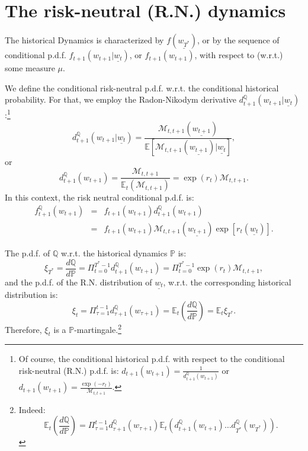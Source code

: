 \documentclass[
  12pt,
]{book}
\theoremstyle{definition}
\theoremstyle{definition}
\theoremstyle{definition}
\theoremstyle{definition}
\theoremstyle{remark}
\begin{document}
\hypertarget{PricingRN}{%
\section{The risk-neutral (R.N.) dynamics}\label{PricingRN}}

The historical Dynamics is characterized by \(f(\underline{w_{T^*}})\), or by the
sequence of conditional p.d.f. \(f_{t+1}(w_{t+1}|\underline{w_t})\), or
\(f_{t+1}(w_{t+1})\), with respect to (w.r.t.) some measure \(\mu\).

We define the conditional risk-neutral p.d.f. w.r.t. the conditional historical probability. For that, we employ the Radon-Nikodym derivative \(d^{\mathbb{Q}}_{t+1}(w_{t+1}|\underline{w_t})\):\footnote{Of course, the conditional historical p.d.f. with respect to the conditional risk-neutral (R.N.) p.d.f. is:
  \(d_{t+1}(w_{t+1}) = \frac{1}{d^{\mathbb{Q}}_{t+1}(w_{t+1})}\) or \(d_{t+1}(w_{t+1}) = \frac{\exp(-r_{t})}{\mathcal{M}_{t,t+1}}\).}
\[
d^{\mathbb{Q}}_{t+1}(w_{t+1}|\underline{w_t}) =
\frac{\mathcal{M}_{t,t+1}(\underline{w_{t+1}})}{\mathbb{E}[\mathcal{M}_{t,t+1}(\underline{w_{t+1}})|\underline{w_t}]},
\]
or
\[
d^{\mathbb{Q}}_{t+1}(w_{t+1})=
\frac{\mathcal{M}_{t,t+1}}{\mathbb{E}_t(\mathcal{M}_{t,t+1})}=\exp(r_{t}) \mathcal{M}_{t,t+1}.
\]
In this context, the risk neutral conditional p.d.f. is:
\begin{eqnarray}
f^{\mathbb{Q}}_{t+1}(w_{t+1}) &=& f_{t+1}(w_{t+1})d^{\mathbb{Q}}_{t+1}(w_{t+1}) \nonumber \\
&=&f_{t+1} (w_{t+1}) \mathcal{M}_{t,t+1} (\underline{w_{t+1}}) \exp [r_{t} (\underline{w_t})].\label{eq:fQfP}
\end{eqnarray}

The p.d.f. of \(\mathbb{Q}\) w.r.t. the historical dynamics \(\mathbb{P}\) is:
\[
\xi_{T^*} =  \frac{d\mathbb{Q}}{d\mathbb{P}} =
\Pi^{T^{*}-1}_{t=0} d^{\mathbb{Q}}_{t+1}(w_{t+1}) =
\Pi^{T^{*}-1}_{t=0} \exp(r_{t}) \mathcal{M}_{t,t+1},
\]
and the p.d.f. of the R.N. distribution of \(\underline{w_t}\), w.r.t. the corresponding historical distribution is:
\[
\xi_t= \Pi^{t-1}_{\tau=1}
d^{\mathbb{Q}}_{\tau+1}(w_{\tau+1})=\mathbb{E}_t\left(\frac{d\mathbb{Q}}{d\mathbb{P}}\right) = \mathbb{E}_t\xi_{T^*}.
\]
Therefore, \(\xi_t\) is a \(\mathbb{P}\)-martingale.\footnote{Indeed:
  \[
  \mathbb{E}_t \left( \frac{d\mathbb{Q}}{d\mathbb{P}}\right) = \Pi^{t-1}_{\tau = 1} d^{\mathbb{Q}}_{\tau + 1} (w_{\tau+1}) \mathbb{E}_t \left( d^{\mathbb{Q}}_{t+1} (w_{t+1}) \ldots d^{\mathbb{Q}}_{T^*} (w_{T^*})\right).
  \]}
\end{document}
